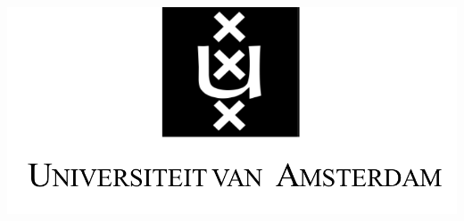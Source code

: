 \begin{titlepage}
\bigskip
\bigskip
\begin{center}
\mbox{\includegraphics[width=.2\paperwidth]{Style/TitlePages/logos/logo-uva.png} 
%
}
\end{center}
\end{titlepage}

%
%
%
